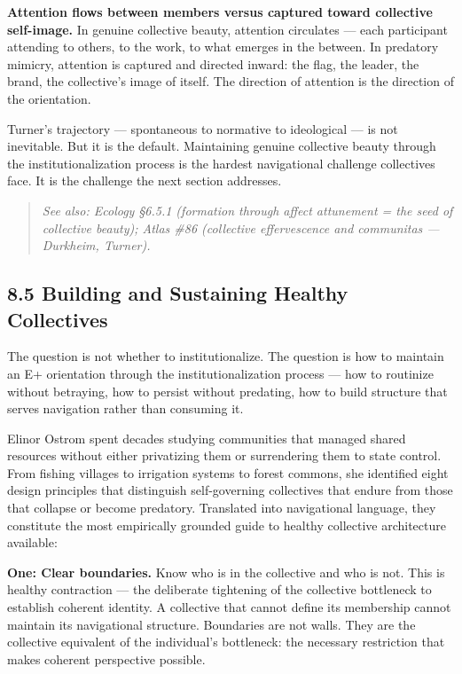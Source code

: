 \textbf{Attention flows between members versus captured toward collective self-image.} In genuine collective beauty, attention circulates — each participant attending to others, to the work, to what emerges in the between. In predatory mimicry, attention is captured and directed inward: the flag, the leader, the brand, the collective's image of itself. The direction of attention is the direction of the orientation.


Turner's trajectory — spontaneous to normative to ideological — is not inevitable. But it is the default. Maintaining genuine collective beauty through the institutionalization process is the hardest navigational challenge collectives face. It is the challenge the next section addresses.


\begin{quote}
\itshape
\textit{See also: Ecology §6.5.1 (formation through affect attunement = the seed of collective beauty); Atlas \#86 (collective effervescence and communitas — Durkheim, Turner).}
\end{quote}


\bigskip\noindent\makebox[\textwidth]{\color{rulegray}\rule{5cm}{0.3pt}}\bigskip


\subsection*{8.5 Building and Sustaining Healthy Collectives}


The question is not whether to institutionalize. The question is how to maintain an E+ orientation through the institutionalization process — how to routinize without betraying, how to persist without predating, how to build structure that serves navigation rather than consuming it.


Elinor Ostrom spent decades studying communities that managed shared resources without either privatizing them or surrendering them to state control. From fishing villages to irrigation systems to forest commons, she identified eight design principles that distinguish self-governing collectives that endure from those that collapse or become predatory. Translated into navigational language, they constitute the most empirically grounded guide to healthy collective architecture available:


\textbf{One: Clear boundaries.} Know who is in the collective and who is not. This is healthy contraction — the deliberate tightening of the collective bottleneck to establish coherent identity. A collective that cannot define its membership cannot maintain its navigational structure. Boundaries are not walls. They are the collective equivalent of the individual's bottleneck: the necessary restriction that makes coherent perspective possible.


